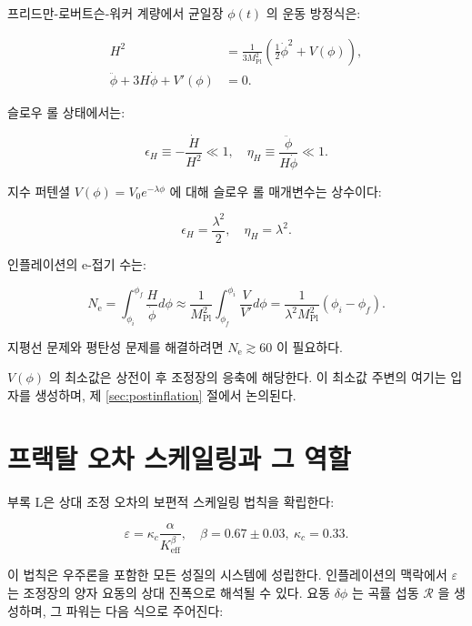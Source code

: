 \documentclass[11pt,a4paper]{article}
\theoremstyle{remark}
\newcommand{\Keff}{K_{\mathrm{eff}}}
\newcommand{\kappac}{\kappa_c}
\newcommand{\eps}{\varepsilon}
\newcommand{\Mpl}{M_{\mathrm{Pl}}}
\newcommand{\ninf}{N_{\mathrm{e}}}
\begin{document}
	프리드만-로버트슨-워커 계량에서 균일장 $\phi(t)$ 의 운동 방정식은:
	
	\begin{align}
		H^2 &= \frac{1}{3\Mpl^2} \left( \frac{1}{2}\dot{\phi}^2 + V(\phi) \right), \label{eq:friedman1} \\
		\ddot{\phi} + 3H\dot{\phi} + V'(\phi) &= 0. \label{eq:field}
	\end{align}
	
	슬로우 롤 상태에서는:
	
	\begin{equation}
		\epsilon_H \equiv -\frac{\dot{H}}{H^2} \ll 1, \quad \eta_H \equiv \frac{\ddot{\phi}}{H\dot{\phi}} \ll 1.
	\end{equation}
	
	지수 퍼텐셜 $V(\phi) = V_0 e^{-\lambda \phi}$ 에 대해 슬로우 롤 매개변수는 상수이다:
	
	\begin{equation}
		\epsilon_H = \frac{\lambda^2}{2}, \quad \eta_H = \lambda^2.
		\label{eq:slowroll}
	\end{equation}
	
	인플레이션의 e-접기 수는:
	
	\begin{equation}
		\ninf = \int_{\phi_i}^{\phi_f} \frac{H}{\dot{\phi}} d\phi \approx \frac{1}{\Mpl^2} \int_{\phi_f}^{\phi_i} \frac{V}{V'} d\phi = \frac{1}{\lambda^2 \Mpl^2} (\phi_i - \phi_f).
	\end{equation}
	
	지평선 문제와 평탄성 문제를 해결하려면 $\ninf \gtrsim 60$ 이 필요하다.
	
	$V(\phi)$ 의 최소값은 상전이 후 조정장의 응축에 해당한다. 이 최소값 주변의 여기는 입자를 생성하며, 제 \ref{sec:postinflation} 절에서 논의된다.
	
	\section{프랙탈 오차 스케일링과 그 역할}
	\label{sec:fractal}
	
	부록 L은 상대 조정 오차의 보편적 스케일링 법칙을 확립한다:
	
	\begin{equation}
		\eps = \kappac \frac{\alpha}{\Keff^{\beta}}, \quad \beta = 0.67 \pm 0.03,\ \kappac = 0.33.
		\label{eq:error-scaling}
	\end{equation}
	
	이 법칙은 우주론을 포함한 모든 성질의 시스템에 성립한다. 인플레이션의 맥락에서 $\eps$ 는 조정장의 양자 요동의 상대 진폭으로 해석될 수 있다. 요동 $\delta \phi$ 는 곡률 섭동 $\mathcal{R}$ 을 생성하며, 그 파워는 다음 식으로 주어진다:
	
\end{document}
